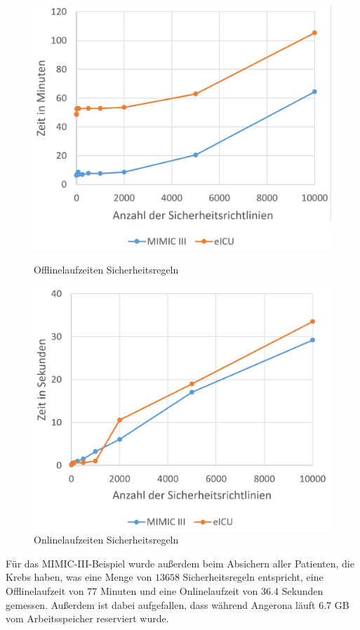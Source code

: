 \documentclass[german,version-2020-11]{uzl-thesis}
\begin{document}
	\begin{figure}[ht]
	\begin{minipage}{.5\textwidth}
		\centering
		\includegraphics[width=0.9\linewidth]{assets/OfflineEicuMimic.png}
		\caption{Offlinelaufzeiten Sicherheitsregeln}
		\label{fig:offlinesecures}
	\end{minipage}
	\begin{minipage}{.5\textwidth}
		\centering
		\includegraphics[width=0.9\linewidth]{assets/onlineEicuMimic.png}
		\caption{Onlinelaufzeiten Sicherheitsregeln}
		\label{fig:onlinesecures}
	\end{minipage}
\end{figure}
Für das MIMIC-III-Beispiel wurde außerdem beim Absichern aller Patienten, die Krebs haben, was eine Menge von $13658$ Sicherheitsregeln entspricht, eine Offlinelaufzeit von $77$ Minuten und eine Onlinelaufzeit von $36.4$ Sekunden gemessen. Außerdem ist dabei aufgefallen, dass während Angerona läuft $6.7$ GB vom Arbeitsspeicher reserviert wurde. \\ 
\end{document}
